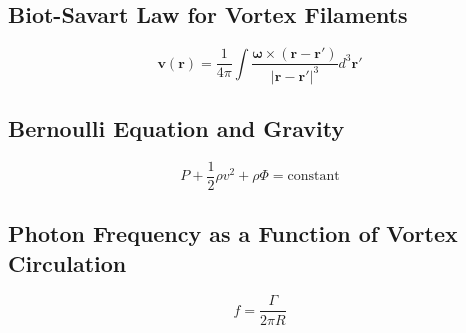 \documentclass[12pt]{article}
\begin{document}
    \subsection{Biot-Savart Law for Vortex Filaments}
    \begin{equation}
        \mathbf{v}(\mathbf{r}) = \frac{1}{4\pi} \int \frac{\boldsymbol{\omega} \times (\mathbf{r} - \mathbf{r'})}{|\mathbf{r} - \mathbf{r'}|^3} d^3\mathbf{r'}
    \end{equation}

    \subsection{Bernoulli Equation and Gravity}
    \begin{equation}
        P + \frac{1}{2} \rho v^2 + \rho \Phi = \text{constant}
    \end{equation}

    \subsection{Photon Frequency as a Function of Vortex Circulation}
    \begin{equation}
        f = \frac{\Gamma}{2\pi R}
    \end{equation}
\end{document}
